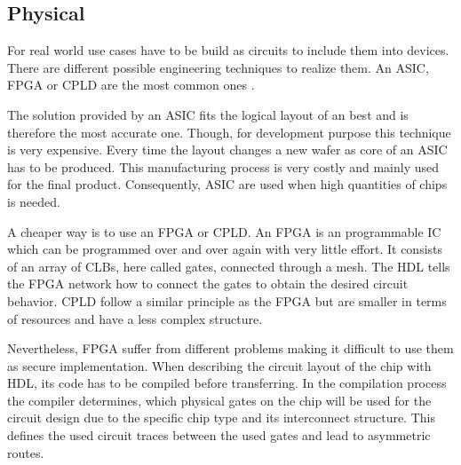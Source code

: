 
\subsection{Physical}
\label{sec:physical}

For real world use cases \apufs have to be build as circuits to include them into devices.
There are different possible engineering techniques to realize them.
An \ac{ASIC}, \ac{FPGA} or \ac{CPLD} are the most common ones \cite{Maes2012ExperimentalCMOS, Majzoobi2010FPGALines, Soybali2011ImplementationFPGA, Tajik2014PhysicalPUFs}.

The solution provided by an \ac{ASIC} fits the logical layout of an \apuf best and is therefore the most accurate one. %
Though, for development purpose this technique is very expensive.
Every time the layout changes a new wafer as core of an \ac{ASIC} has to be produced.
This manufacturing process is very costly and mainly used for the final product.
Consequently, \ac{ASIC} are used when high quantities of chips is needed.

A cheaper way is to use an \ac{FPGA} or \ac{CPLD}. 
An \ac{FPGA} is an programmable \ac{IC} which can be programmed over and over again with very little effort.
It consists of an array of \acp{CLB}, here called gates, connected through a mesh. %
The \ac{HDL} tells the \ac{FPGA} network how to connect the gates to obtain the desired circuit behavior. %
\ac{CPLD} follow a similar principle as the \ac{FPGA} but are smaller in terms of resources and have a less complex structure.

Nevertheless, \ac{FPGA} suffer from different problems making it difficult to use them as secure \apuf implementation.
When describing the circuit layout of the chip with \ac{HDL}, its code has to be compiled before transferring. %
In the compilation process the compiler determines, which physical gates on the chip will be used for the circuit design due to the specific chip type and its interconnect structure.
This defines the used circuit traces between the used gates and lead to asymmetric routes. %

